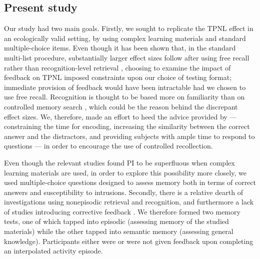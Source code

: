 \documentclass[../main.tex]{subfiles}
\begin{document}
\subsection{Present study\label{present}}

Our study had two main goals. Firstly, we sought to replicate the TPNL 
effect in an ecologically valid setting, by using complex learning materials 
and standard multiple-choice items. Even though it has been shown that, in 
the standard multi-list procedure, substantially larger effect sizes follow 
after using free recall rather than recognition-level retrieval 
 \citep{chanRetrievalPotentiatesNew2018}, choosing to examine the impact of 
feedback on TPNL imposed constraints upon our choice of testing format; 
immediate provision of feedback would have been intractable had we chosen 
to use free recall. Recognition is thought to be based more on familiarity 
than on controlled memory search 
\citep{yonelinasNatureRecollectionFamiliarity2002}, which could be the 
reason 
behind the discrepant effect sizes. We, therefore, made an effort to heed 
the advice provided by \cite{chanTestingEffectRecognition2007} --- 
constraining the time for encoding, increasing the similarity between the 
correct answer and the distractors, and providing subjects with ample time 
to respond to questions --- in order to encourage the use of controlled 
recollection.

Even though the relevant studies found PI to be 
superfluous when complex learning materials are used, in order to explore 
this possibility more closely, we used multiple-choice questions designed to 
assess memory both in terms of correct answers and susceptibility to 
intrusions. Secondly, there is a relative dearth of investigations using 
nonepisodic retrieval and recognition, and furthermore a lack of studies 
introducing corrective feedback \citep{chanRetrievalPotentiatesNew2018}. We 
therefore formed two memory tests, one of which tapped into episodic 
(assessing memory of the studied materials) while the other tapped into 
semantic memory (assessing general knowledge). Participants either were or 
were not given feedback upon completing an interpolated activity episode.
\end{document}
